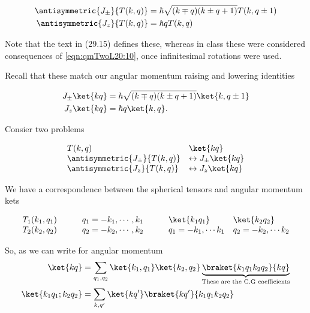 \begin{align}\label{eqn:qmTwoL20:50}
\antisymmetric{J_{\pm}}{T(k, q)} &= \hbar \sqrt{(k \mp q)(k \pm q + 1)} T(k, q \pm 1) \\
\antisymmetric{J_{z}}{T(k, q)} &= \hbar q T(k, q)
\end{align}

Note that the text in (29.15) defines these, whereas in class these were considered consequences of \ref{eqn:qmTwoL20:10}, once infinitesimal rotations were used.

Recall that these match our angular momentum raising and lowering identities

\begin{align}\label{eqn:qmTwoL20:50b}
J_{\pm} \ket{k q} &= \hbar \sqrt{(k \mp q)(k \pm q + 1)} \ket{k, q \pm 1} \\
J_{z} \ket{k q} &= \hbar q \ket{k, q}.
\end{align}

Consier two problems 

\begin{equation}\label{eqn:qmTwoL20:70}
\begin{array}{l l}
T(k, q)						& \ket{k q} \\
\antisymmetric{J_{\pm}}{T(k, q)} 		&\leftrightarrow J_{\pm} \ket{k q} \\
\antisymmetric{J_{z}}{T(k, q)} 			&\leftrightarrow J_{z} \ket{k q}
\end{array}
\end{equation}

We have a correspondence between the spherical tensors and angular momentum kets

\begin{equation}\label{eqn:qmTwoL20:330}
\begin{array}{l l l l}
T_1(k_1, q_1)&\qquad q_1 = -k_1, \cdots, k_1 		& \qquad \ket{k_1 q_1} 		& \ket{k_2 q_2} \\
T_2(k_2, q_2)&\qquad q_2 = -k_2, \cdots, k_2		& \qquad q_1 = -k_1, \cdots k_1 	& q_2 = -k_2, \cdots k_2 \\
\end{array}
\end{equation}

So, as we can write for angular momentum
\begin{align*}
\ket{kq} &= \sum_{q_1, q_2} 
\ket{k_1, q_1}
\ket{k_2, q_2}
\underbrace{\braket{ k_1 q_1 k_2 q_2 }{ k q}}_{\text{These are the C.G coefficients}}  \\
\ket{k_1 q_1 ; k_2 q_2}
&=
\sum_{k, q'}
\ket{k q'} \braket{ k q'}{ k_1 q_1 k_2 q_2 } 
\end{align*}

